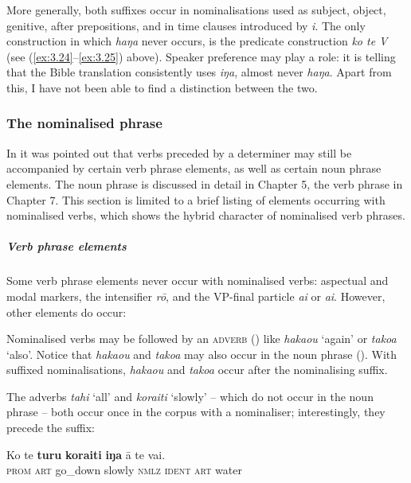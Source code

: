 More generally, both suffixes occur in nominalisations used as subject, object, genitive, after prepositions, and in time clauses introduced by \textit{{\ꞌ}i}. The only construction in which \textit{haŋa} never occurs, is the predicate construction \textit{ko te V} (see (\ref{ex:3.24}–\ref{ex:3.25}) above). Speaker preference may play a role: it is telling that the Bible translation consistently uses \textit{iŋa}, almost never \textit{haŋa}. Apart from this, I have not been able to find a distinction between the two.

\subsubsection[The nominalised phrase]{The nominalised phrase}\label{sec:3.2.3.3}

In  it was pointed out that verbs preceded by a determiner may still be accompanied by certain verb phrase elements, as well as certain noun phrase elements. The noun phrase is discussed in detail in Chapter 5, the verb phrase in Chapter 7. This section is limited to a brief listing of elements occurring with nominalised verbs, which shows the hybrid character of nominalised verb phrases.

\subparagraph{Verb phrase elements} Some verb phrase elements never occur with nominalised verbs: aspectual and modal markers, the intensifier \textit{rō}, and the VP{}-final particle \textit{ai} or \textit{{\ꞌ}ai}. However, other elements do occur:

Nominalised verbs may be followed by an \textsc{adverb} () like \textit{haka{\ꞌ}ou} ‘again’ or \textit{\mbox{tako{\ꞌ}a}} ‘also’. Notice that \textit{haka{\ꞌ}ou} and \textit{tako{\ꞌ}a} may also occur in the noun phrase (). With suffixed nominalisations, \textit{haka{\ꞌ}ou} and \textit{tako{\ꞌ}a} occur after the nominalising suffix. 

The adverbs \textit{tahi} ‘all’ and \textit{kora{\ꞌ}iti} ‘slowly’ – which do not occur in the noun phrase – both occur once in the corpus with a nominaliser; interestingly, they precede the suffix:

\ea\label{ex:3.52}
\gll Ko te \textbf{turu} \textbf{kora{\ꞌ}iti} \textbf{iŋa} {\ꞌ}ā te vai.\\
\textsc{prom} \textsc{art} go\_down slowly \textsc{nmlz} \textsc{ident} \textsc{art} water\\

